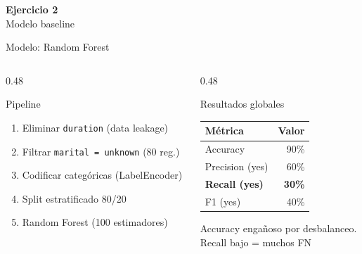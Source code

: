 \documentclass[aspectratio=169, 11pt]{beamer}
\begin{document}
{
\begin{frame}[plain]
\vfill
\begin{center}
{\color{white}\LARGE\bfseries Ejercicio 2}\\[8pt]
{\color{azulclaro}\large Modelo baseline}
\end{center}
\vfill
\end{frame}
}

\begin{frame}{Modelo: Random Forest}
\begin{columns}[T]
\begin{column}{0.48\textwidth}
\begin{block}{Pipeline}
\begin{enumerate}
\item Eliminar \texttt{duration} (data leakage)
\item Filtrar \texttt{marital = unknown} (80 reg.)
\item Codificar categóricas (LabelEncoder)
\item Split estratificado 80/20
\item Random Forest (100 estimadores)
\end{enumerate}
\end{block}
\end{column}
\begin{column}{0.48\textwidth}
\begin{block}{Resultados globales}
\begin{center}
\begin{tabular}{l r}
\toprule
\textbf{Métrica} & \textbf{Valor} \\
\midrule
\rowcolor{gris10} Accuracy & 90\% \\
Precision (yes) & 60\% \\
\rowcolor{gris10} \textbf{Recall (yes)} & \textbf{30\%} \\
F1 (yes) & 40\% \\
\bottomrule
\end{tabular}
\end{center}
\vspace{4pt}
{\small\color{gris50} Accuracy engañoso por desbalanceo.\\
Recall bajo = muchos FN}
\end{block}
\end{column}
\end{columns}
\end{frame}
\end{document}
